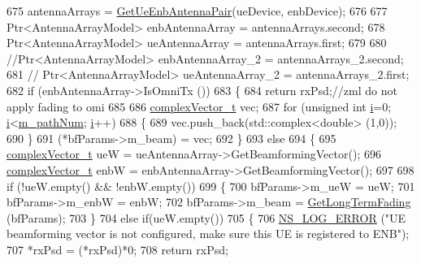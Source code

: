 \begin{DoxyCode}
675          antennaArrays = \hyperlink{classns3_1_1MmWaveBeamforming_ac7cbf30e822589a92838ab709632389b}{GetUeEnbAntennaPair}(ueDevice, enbDevice);
676 
677         Ptr<AntennaArrayModel> enbAntennaArray = antennaArrays.second;
678         Ptr<AntennaArrayModel> ueAntennaArray = antennaArrays.first;
679 
680         \textcolor{comment}{//Ptr<AntennaArrayModel> enbAntennaArray\_2 = antennaArrays\_2.second;}
681         \textcolor{comment}{//      Ptr<AntennaArrayModel> ueAntennaArray\_2 = antennaArrays\_2.first;}
682         \textcolor{keywordflow}{if} (enbAntennaArray->IsOmniTx ())
683         \{
684                 \textcolor{keywordflow}{return} rxPsd;\textcolor{comment}{//zml do not apply fading to omi}
685 
686                 \hyperlink{namespacens3_a6a7f75817ae50e6ac47414955b17d926}{complexVector\_t} vec;
687                 \textcolor{keywordflow}{for} (\textcolor{keywordtype}{unsigned} \textcolor{keywordtype}{int} \hyperlink{bernuolliDistribution_8m_a6f6ccfcf58b31cb6412107d9d5281426}{i}=0; \hyperlink{bernuolliDistribution_8m_a6f6ccfcf58b31cb6412107d9d5281426}{i}<\hyperlink{classns3_1_1MmWaveBeamforming_a4aeb1eea76b6ba2be91c411494b4c573}{m\_pathNum}; \hyperlink{bernuolliDistribution_8m_a6f6ccfcf58b31cb6412107d9d5281426}{i}++)
688                 \{
689                         vec.push\_back(std::complex<double> (1,0));
690                 \}
691                 (*bfParams->m\_beam) = vec;
692         \}
693         \textcolor{keywordflow}{else}
694         \{
695                 \hyperlink{namespacens3_a6a7f75817ae50e6ac47414955b17d926}{complexVector\_t} ueW = ueAntennaArray->GetBeamformingVector();
696                 \hyperlink{namespacens3_a6a7f75817ae50e6ac47414955b17d926}{complexVector\_t} enbW = enbAntennaArray->GetBeamformingVector();
697 
698                 \textcolor{keywordflow}{if} (!ueW.empty() && !enbW.empty())
699                 \{
700                         bfParams->m\_ueW = ueW;
701                         bfParams->m\_enbW = enbW;
702                         bfParams->m\_beam = \hyperlink{classns3_1_1MmWaveBeamforming_aaebee646eb65674e6a52053dca949019}{GetLongTermFading} (bfParams);
703                 \}
704                 \textcolor{keywordflow}{else} \textcolor{keywordflow}{if}(ueW.empty())
705                 \{
706                         \hyperlink{group__logging_ga0261a8db1d4ac5f79417d117634fd455}{NS\_LOG\_ERROR} (\textcolor{stringliteral}{"UE beamforming vector is not configured, make sure this
       UE is registered to ENB"});
707                         *rxPsd = (*rxPsd)*0;
708                         \textcolor{keywordflow}{return} rxPsd;

\end{DoxyCode}
